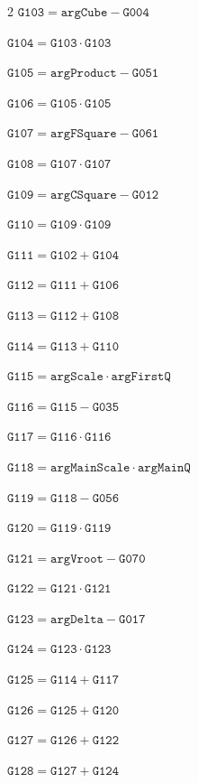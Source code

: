 \documentclass[10pt]{article}
\begin{document}
\begin{multicols}{2}
\noindent $\mathtt{G103}=\mathtt{argCube}-\mathtt{G004}$\par
\noindent $\mathtt{G104}=\mathtt{G103}\cdot \mathtt{G103}$\par
\noindent $\mathtt{G105}=\mathtt{argProduct}-\mathtt{G051}$\par
\noindent $\mathtt{G106}=\mathtt{G105}\cdot \mathtt{G105}$\par
\noindent $\mathtt{G107}=\mathtt{argFSquare}-\mathtt{G061}$\par
\noindent $\mathtt{G108}=\mathtt{G107}\cdot \mathtt{G107}$\par
\noindent $\mathtt{G109}=\mathtt{argCSquare}-\mathtt{G012}$\par
\noindent $\mathtt{G110}=\mathtt{G109}\cdot \mathtt{G109}$\par
\noindent $\mathtt{G111}=\mathtt{G102}+\mathtt{G104}$\par
\noindent $\mathtt{G112}=\mathtt{G111}+\mathtt{G106}$\par
\noindent $\mathtt{G113}=\mathtt{G112}+\mathtt{G108}$\par
\noindent $\mathtt{G114}=\mathtt{G113}+\mathtt{G110}$\par
\noindent $\mathtt{G115}=\mathtt{argScale}\cdot \mathtt{argFirstQ}$\par
\noindent $\mathtt{G116}=\mathtt{G115}-\mathtt{G035}$\par
\noindent $\mathtt{G117}=\mathtt{G116}\cdot \mathtt{G116}$\par
\noindent $\mathtt{G118}=\mathtt{argMainScale}\cdot \mathtt{argMainQ}$\par
\noindent $\mathtt{G119}=\mathtt{G118}-\mathtt{G056}$\par
\noindent $\mathtt{G120}=\mathtt{G119}\cdot \mathtt{G119}$\par
\noindent $\mathtt{G121}=\mathtt{argVroot}-\mathtt{G070}$\par
\noindent $\mathtt{G122}=\mathtt{G121}\cdot \mathtt{G121}$\par
\noindent $\mathtt{G123}=\mathtt{argDelta}-\mathtt{G017}$\par
\noindent $\mathtt{G124}=\mathtt{G123}\cdot \mathtt{G123}$\par
\noindent $\mathtt{G125}=\mathtt{G114}+\mathtt{G117}$\par
\noindent $\mathtt{G126}=\mathtt{G125}+\mathtt{G120}$\par
\noindent $\mathtt{G127}=\mathtt{G126}+\mathtt{G122}$\par
\noindent $\mathtt{G128}=\mathtt{G127}+\mathtt{G124}$\par

\end{multicols}
\end{document}
